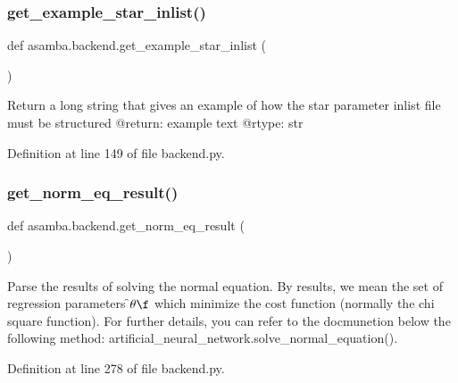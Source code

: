 \subsubsection{\texorpdfstring{get\+\_\+example\+\_\+star\+\_\+inlist()}{get\_example\_star\_inlist()}}
{\footnotesize\ttfamily def asamba.\+backend.\+get\+\_\+example\+\_\+star\+\_\+inlist (\begin{DoxyParamCaption}{ }\end{DoxyParamCaption})}

\begin{DoxyVerb}Return a long string that gives an example of how the star parameter inlist file must be structured
@return: example text
@rtype: str
\end{DoxyVerb}
 

Definition at line 149 of file backend.\+py.

\mbox{\label{namespaceasamba_1_1backend_a0632807c78a1c7393f0c6295de7130f0}} 
\subsubsection{\texorpdfstring{get\+\_\+norm\+\_\+eq\+\_\+result()}{get\_norm\_eq\_result()}}
{\footnotesize\ttfamily def asamba.\+backend.\+get\+\_\+norm\+\_\+eq\+\_\+result (\begin{DoxyParamCaption}{ }\end{DoxyParamCaption})}

\begin{DoxyVerb}Parse the results of solving the normal equation. By results, we mean the set of 
regression parameters \f$\theta\f$ which minimize the cost function (normally the 
chi square function). For further details, you can refer to the docmunetion below
the following method: artificial_neural_network.solve_normal_equation(). 
\end{DoxyVerb}
 

Definition at line 278 of file backend.\+py.

\mbox{\label{namespaceasamba_1_1backend_a6d6a812ce0d681b4deb0768cb9b2df69}} 
